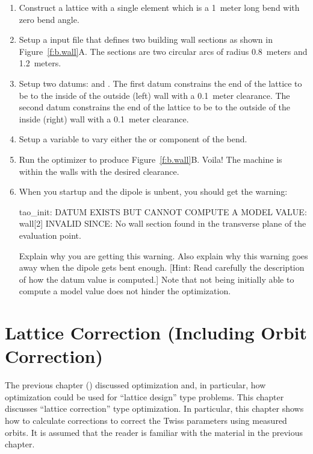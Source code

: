 \documentclass{hitec}     %
\newcommand{\Section}[1]{\section{#1}\vspace*{-1ex}}
\begin{document}
{\begin{enumerate}[label=\thesection.\arabic{enumi}]
\begin{enumerate}
\item
Construct a lattice with a single element which is a 1~meter long bend with zero bend angle.
\item
Setup a \tao input file that defines two building wall sections as shown in
Figure~\ref{f:b.wall}A. The sections are two circular arcs of radius 0.8~meters and 1.2~meters.
\item
Setup two datums:  and . The first datum constrains the end of the lattice
to be to the inside of the outside (left) wall with a 0.1~meter clearance. The second datum constrains
the end of the lattice to be to the outside of the inside (right) wall with a 0.1~meter clearance.
\item
Setup a variable to vary either the  or  component of the bend.
\item
Run the  optimizer to produce Figure~\ref{f:b.wall}B. Voila! The machine is within the walls with
the desired clearance.
\item
When you startup \tao and the dipole is unbent, you should get the warning:
\begin{code}
[WARNING] tao_init:
    DATUM EXISTS BUT CANNOT COMPUTE A MODEL VALUE: wall[2]
       INVALID SINCE: No wall section found in the transverse plane
                      of the evaluation point.
\end{code}
Explain why you are getting this warning. Also explain why this warning goes away when the dipole
gets bent enough. [Hint: Read carefully the description of how the datum value is computed.] Note
that not being initially able to compute a model value does not hinder the optimization.
\end {enumerate}

\end{enumerate}

\newpage

\Section{Lattice Correction (Including Orbit Correction)}
\label{s:opt.cor}

The previous chapter () discussed optimization and, in particular, how optimization
could be used for ``lattice design'' type problems. This chapter discusses ``lattice correction''
type optimization. In particular, this chapter shows how to calculate corrections to correct the
Twiss parameters using measured orbits. It is assumed that the reader is familiar with the material
in the previous chapter.

}
\end{document}
